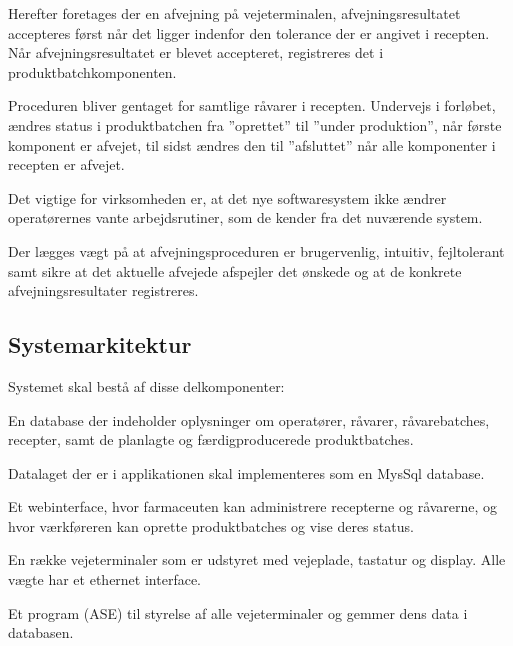 \documentclass[a4paper]{article}
\newenvironment{my_itemize}
{\begin{itemize}
  \setlength{\itemsep}{1pt}
  \setlength{\parskip}{0pt}
  \setlength{\parsep}{0pt}}
{\end{itemize}}
\begin{document}
Herefter foretages der en afvejning på vejeterminalen, afvejningsresultatet accepteres først når det ligger indenfor den tolerance der er angivet i recepten. Når afvejningsresultatet er blevet accepteret, registreres det i produktbatchkomponenten. 

Proceduren bliver gentaget for samtlige råvarer i recepten. Undervejs i forløbet, ændres status i produktbatchen fra ”oprettet” til ”under produktion”, når første komponent er afvejet, til sidst ændres den til ”afsluttet” når alle komponenter i recepten er afvejet.

Det vigtige for virksomheden er, at det nye softwaresystem ikke ændrer operatørernes vante arbejdsrutiner, som de kender fra det nuværende system.

Der lægges vægt på at afvejningsproceduren er brugervenlig, intuitiv, fejltolerant samt sikre at det aktuelle afvejede afspejler det ønskede og at de konkrete afvejningsresultater registreres.



\subsection{Systemarkitektur} %

Systemet skal bestå af disse delkomponenter:

\begin{my_itemize}
  \item En database der indeholder oplysninger om operatører, råvarer, råvarebatches, recepter, samt de planlagte og færdigproducerede produktbatches. 
    \begin{my_itemize}
      \item Datalaget der er i applikationen skal implementeres som en MysSql database.
    \end{my_itemize}
  \item Et webinterface, hvor farmaceuten kan administrere recepterne og råvarerne, og hvor værkføreren kan oprette produktbatches og vise deres status.
  \item En række vejeterminaler som er udstyret med vejeplade, tastatur og display. Alle vægte har et ethernet interface. 
  \item Et program (ASE) til styrelse af alle vejeterminaler og gemmer dens data i databasen.
\end{my_itemize}

\end{document}
